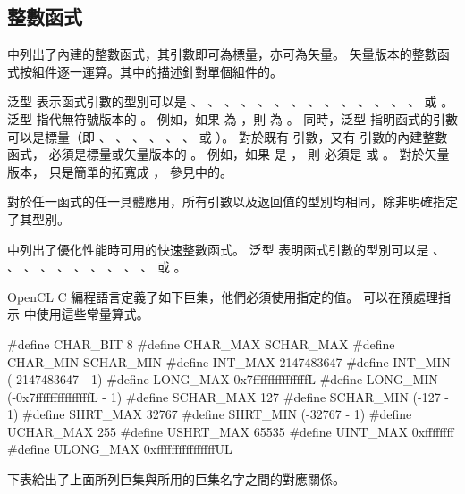\subsection[sec:integerFunc]{整數函式}

中列出了內建的整數函式，其引數即可為標量，亦可為矢量。
矢量版本的整數函式按組件逐一運算。其中的描述針對單個組件的。

泛型  表示函式引數的型別可以是
 、 、
 、 、
 、 、
 、 、
 、 、
 、 、
 、 、
  或 。
泛型  指代無符號版本的 。
例如，如果  為 ，則  為 。
同時，泛型  指明函式的引數可以是標量（即
 、 、 、 、
 、 、  或 ）。
對於既有  引數，又有  引數的內建整數函式，
  必須是標量或矢量版本的 。
例如，如果  是 ，
則  必須是  或 。
對於矢量版本，  只是簡單的拓寬成 ，
參見中的。

對於任一函式的任一具體應用，所有引數以及返回值的型別均相同，除非明確指定了其型別。

{}

中列出了優化性能時可用的快速整數函式。
泛型  表明函式引數的型別可以是
 、 、 、
 、 、 、
 、 、 、
 、  或 。

{}

OpenCL C 編程語言定義了如下巨集，他們必須使用指定的值。
可以在預處理指示  中使用這些常量算式。

\startclc
#define CHAR_BIT	8
#define CHAR_MAX	SCHAR_MAX
#define CHAR_MIN	SCHAR_MIN
#define INT_MAX		2147483647
#define INT_MIN		(-2147483647 - 1)
#define LONG_MAX	0x7fffffffffffffffL
#define LONG_MIN	(-0x7fffffffffffffffL - 1)
#define SCHAR_MAX	127
#define SCHAR_MIN	(-127 - 1)
#define SHRT_MAX	32767
#define SHRT_MIN	(-32767 - 1)
#define UCHAR_MAX	255
#define USHRT_MAX	65535
#define UINT_MAX	0xffffffff
#define ULONG_MAX	0xffffffffffffffffUL
\stopclc

下表給出了上面所列巨集與所用的巨集名字之間的對應關係。


